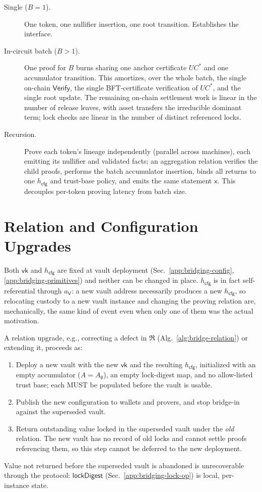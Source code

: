 \begin{description}
  \item[Single ($B=1$).] One token, one nullifier insertion, one root transition. Establishes the interface.
  \item[In-circuit batch ($B>1$).] One proof for $B$ burns sharing one anchor certificate $UC^*$ and one accumulator transition. This amortizes, over the whole batch, the single on-chain $\mathsf{Verify}$, the single BFT-certificate verification of $UC^*$, and the single root update. The remaining on-chain settlement work is linear in the number of release leaves, with asset transfers the irreducible dominant term; lock checks are linear in the number of distinct referenced locks.
  \item[Recursion.] Prove each token's lineage independently (parallel across machines), each emitting its nullifier and validated facts; an aggregation relation verifies the child proofs, performs the batch accumulator insertion, binds all returns to one $h_\mathsf{cfg}$ and trust-base policy, and emits the same statement $\mathsf{x}$. This decouples per-token proving latency from batch size.
\end{description}

\section{Relation and Configuration Upgrades}\label{app:bridging-upgrades}

Both $\mathsf{vk}$ and $h_\mathsf{cfg}$ are fixed at vault deployment (Sec.~\ref{app:bridging-config}, \ref{app:bridging-primitives}) and neither can be changed in place. $h_\mathsf{cfg}$ is in fact self-referential through $a_\mathsf{V}$: a new vault address necessarily produces a new $h_\mathsf{cfg}$, so relocating custody to a new vault instance and changing the proving relation are, mechanically, the same kind of event even when only one of them was the actual motivation.

A relation upgrade, e.g., correcting a defect in $\mathfrak{R}$ (Alg.~\ref{alg:bridge-relation}) or extending it, proceeds as:
\begin{enumerate}
  \item Deploy a new vault with the new $\mathsf{vk}$ and the resulting $h_\mathsf{cfg}$, initialized with an empty accumulator ($A = A_\emptyset$), an empty lock-digest map, and no allow-listed trust base; each MUST be populated before the vault is usable.
  \item Publish the new configuration to wallets and provers, and stop bridge-in against the superseded vault.
  \item Return outstanding value locked in the superseded vault under the \emph{old} relation. The new vault has no record of old locks and cannot settle proofs referencing them, so this step cannot be deferred to the new deployment.
\end{enumerate}
Value not returned before the superseded vault is abandoned is unrecoverable through the protocol: $\mathsf{lockDigest}$ (Sec.~\ref{app:bridging-lock-op}) is local, per-instance state.

